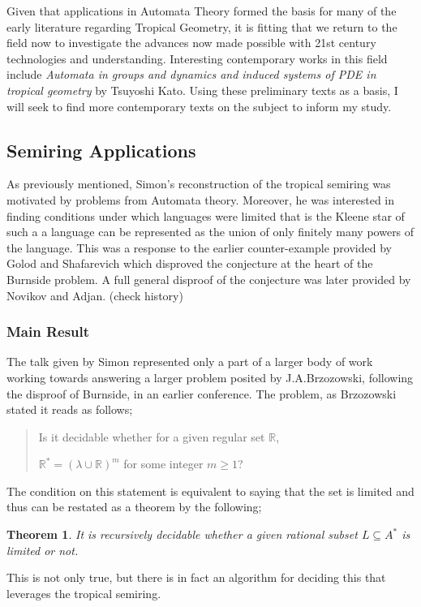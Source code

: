 \documentclass[12pt,a4paper]{amsart}
\newcommand{\R}{\mathbb{R}}
\newtheorem{thm}{Theorem}[section]
\theoremstyle{definition}
\theoremstyle{remark}
\begin{document}
Given that applications in Automata Theory formed the basis for many of the early literature regarding Tropical Geometry\cite{simon1978limited}, it is fitting that we return to the field now to investigate the advances now made possible with 21st century technologies and understanding.
Interesting contemporary works in this field include \textit{Automata in groups and dynamics
and induced systems of PDE in
tropical geometry}\cite{kato2014automata} by Tsuyoshi Kato.
Using these preliminary texts as a basis, I will seek to find more contemporary texts on the subject to inform my study.

\subsection{Semiring Applications}
As previously mentioned, Simon's reconstruction of the tropical semiring was motivated by problems from Automata theory. Moreover, he was interested in finding conditions under which languages were limited that is the Kleene star of such a a language can be represented as the union of only finitely many powers of the language. This was a response to the earlier counter-example provided by Golod and Shafarevich which disproved the conjecture at the heart of the Burnside problem. A full general disproof of the conjecture was later provided by Novikov and Adjan. (check history)

\subsubsection{Main Result}
The talk given by Simon represented only a part of a larger body of work working towards answering a larger problem posited by J.A.Brzozowski, following the disproof of Burnside, in an earlier conference. The problem, as Brzozowski stated it reads as follows;
\begin{quote}
    Is it decidable whether for a given regular set $\R$,
    
    \noindent$\R^*=(\lambda\cup\R)^m$ for some integer $m\geq1$?
\end{quote}
The condition on this statement is equivalent to saying that the set is limited and thus can be restated as a theorem by the following;
\begin{thm}
It is recursively decidable whether a given rational subset $L\subseteq A^*$ is limited or not.
\end{thm}
This is not only true, but there is in fact an algorithm for deciding this that leverages the tropical semiring. 
\end{document}
